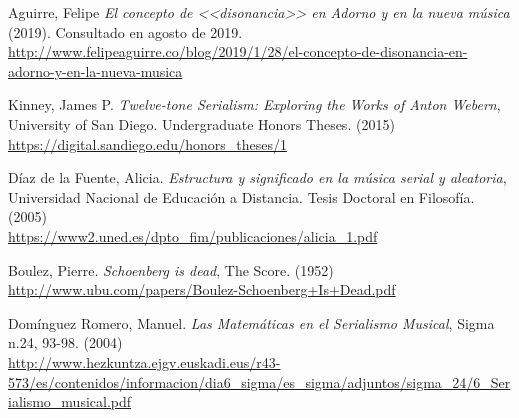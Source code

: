 \renewcommand\refname{Referencias}
	\begin{thebibliography}{00}
			
			

			{ Aguirre, Felipe} 
			\textit{El concepto de <<disonancia>> en Adorno y en la nueva música} (2019). Consultado en agosto de 2019.
			\\\url{http://www.felipeaguirre.co/blog/2019/1/28/el-concepto-de-disonancia-en-adorno-y-en-la-nueva-musica}
			
			{ Kinney, James P.} 
			\textit{Twelve-tone Serialism: Exploring the Works of Anton Webern},
			University of San Diego.
			Undergraduate Honors Theses.
			(2015)
			\\\url{https://digital.sandiego.edu/honors_theses/1}
			
			{ D\'iaz de la Fuente, Alicia.} 
			\textit{Estructura y significado en la m\'usica serial y aleatoria},
			Universidad Nacional de Educaci\'on a Distancia.
			Tesis Doctoral en Filosof\'ia.
			(2005)
			\\\url{https://www2.uned.es/dpto_fim/publicaciones/alicia_1.pdf}		
			
			
			
			{ Boulez, Pierre.}
			\textit{Schoenberg is dead},
			The Score.
			(1952)
			\\\url{http://www.ubu.com/papers/Boulez-Schoenberg+Is+Dead.pdf}
			
			{ Dom\'inguez Romero, Manuel.} 
			\textit{Las Matem\'aticas en el Serialismo Musical},
			Sigma n.24, 93-98.
			(2004)
			\\\url{http://www.hezkuntza.ejgv.euskadi.eus/r43-573/es/contenidos/informacion/dia6_sigma/es_sigma/adjuntos/sigma_24/6_Serialismo_musical.pdf}


\end{thebibliography}
